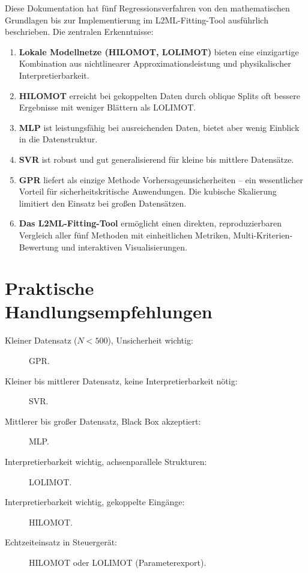 \documentclass[11pt,a4paper]{report}
\begin{document}
Diese Dokumentation hat f\"{u}nf Regressionsverfahren von den mathematischen Grundlagen bis zur
Implementierung im L2ML-Fitting-Tool ausf\"{u}hrlich beschrieben. Die zentralen Erkenntnisse:

\begin{enumerate}
\item \textbf{Lokale Modellnetze (HILOMOT, LOLIMOT)} bieten eine einzigartige Kombination aus
      nichtlinearer Approximationsleistung und physikalischer Interpretierbarkeit.

\item \textbf{HILOMOT} erreicht bei gekoppelten Daten durch oblique Splits oft bessere
      Ergebnisse mit weniger Bl\"{a}ttern als LOLIMOT.

\item \textbf{MLP} ist leistungsf\"{a}hig bei ausreichenden Daten, bietet aber wenig Einblick
      in die Datenstruktur.

\item \textbf{SVR} ist robust und gut generalisierend f\"{u}r kleine bis mittlere Datens\"{a}tze.

\item \textbf{GPR} liefert als einzige Methode Vorhersageunsicherheiten -- ein wesentlicher
      Vorteil f\"{u}r sicherheitskritische Anwendungen. Die kubische Skalierung limitiert den
      Einsatz bei gro\ss{}en Datens\"{a}tzen.

\item \textbf{Das L2ML-Fitting-Tool} erm\"{o}glicht einen direkten, reproduzierbaren Vergleich
      aller f\"{u}nf Methoden mit einheitlichen Metriken, Multi-Kriterien-Bewertung und
      interaktiven Visualisierungen.
\end{enumerate}

\section{Praktische Handlungsempfehlungen}

\begin{description}
\item[Kleiner Datensatz ($N < 500$), Unsicherheit wichtig:] GPR.
\item[Kleiner bis mittlerer Datensatz, keine Interpretierbarkeit n\"{o}tig:] SVR.
\item[Mittlerer bis gro\ss{}er Datensatz, Black Box akzeptiert:] MLP.
\item[Interpretierbarkeit wichtig, achsenparallele Strukturen:] LOLIMOT.
\item[Interpretierbarkeit wichtig, gekoppelte Eing\"{a}nge:] HILOMOT.
\item[Echtzeiteinsatz in Steuerger\"{a}t:] HILOMOT oder LOLIMOT (Parameterexport).
\end{description}
\end{document}
